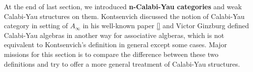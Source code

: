 At the end of last section, we introduced \textbf{n-Calabi-Yau categories} and weak Calabi-Yau structures on them. Kontsenvich discussed the notion of Calabi-Yau category in setting of $A_\infty$ in his well-known paper \ref{} and Victor Ginzburg defined Calabi-Yau algebras in another way for associative algberas, which is not equivalent to Kontsenvich's definition in general except some cases. Major missions for this section is to compare the difference between these two definitions and try to offer a more general treatment of Calabi-Yau structures.